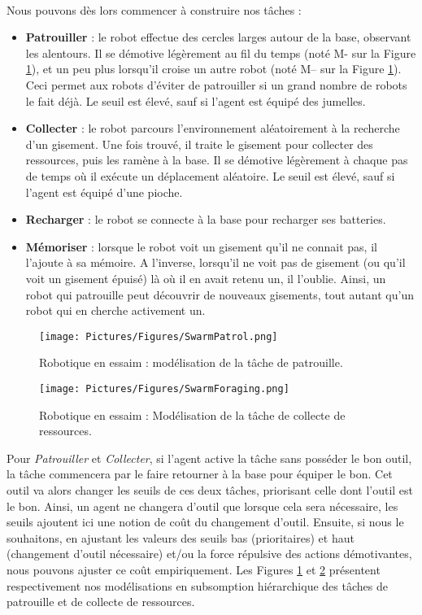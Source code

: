 		\paragraph{}
		Nous pouvons dès lors commencer à construire nos tâches :
		\begin{itemize}
			\item \textbf{Patrouiller} : le robot effectue des cercles larges autour de la base, observant les alentours. Il se démotive légèrement au fil du temps (noté M- sur la Figure \ref{swarmPatrol}), et un peu plus lorsqu'il croise un autre robot (noté M-- sur la Figure \ref{swarmPatrol}). Ceci permet aux robots d'éviter de patrouiller si un grand nombre de robots le fait déjà. Le seuil est élevé, sauf si l'agent est équipé des jumelles.
			\item \textbf{Collecter} : le robot parcours l'environnement aléatoirement à la recherche d'un gisement. Une fois trouvé, il traite le gisement pour collecter des ressources, puis les ramène à la base. Il se démotive légèrement à chaque pas de temps où il exécute un déplacement aléatoire. Le seuil est élevé, sauf si l'agent est équipé d'une pioche.
			\item \textbf{Recharger} : le robot se connecte à la base pour recharger ses batteries.
			\item \textbf{Mémoriser} : lorsque le robot voit un gisement qu'il ne connait pas, il l'ajoute à sa mémoire. A l'inverse, lorsqu'il ne voit pas de gisement (ou qu'il voit un gisement épuisé) là où il en avait retenu un, il l'oublie. Ainsi, un robot qui patrouille peut découvrir de nouveaux gisements, tout autant qu'un robot qui en cherche activement un.
		\end{itemize}
	
	\begin{figure}
	\centering
	\texttt{[image: Pictures/Figures/SwarmPatrol.png]}
	\caption{Robotique en essaim : modélisation de la tâche de patrouille.}
	\label{swarmPatrol}
	\end{figure}
	
	\begin{figure}	
	\centering
	\texttt{[image: Pictures/Figures/SwarmForaging.png]}
	\caption{Robotique en essaim : Modélisation de la tâche de collecte de ressources.}
	\label{swarmForaging}
	\end{figure}
		
		Pour \textit{Patrouiller} et \textit{Collecter}, si l'agent active la tâche sans posséder le bon outil, la tâche commencera par le faire retourner à la base pour équiper le bon. Cet outil va alors changer les seuils de ces deux tâches, priorisant celle dont l'outil est le bon. Ainsi, un agent ne changera d'outil que lorsque cela sera nécessaire, les seuils ajoutent ici une notion de coût du changement d'outil. Ensuite, si nous le souhaitons, en ajustant les valeurs des seuils bas (prioritaires) et haut (changement d'outil nécessaire) et/ou la force répulsive des actions démotivantes, nous pouvons ajuster ce coût empiriquement. Les Figures \ref{swarmPatrol} et \ref{swarmForaging} présentent respectivement nos modélisations en subsomption hiérarchique des tâches de patrouille et de collecte de ressources.
		
